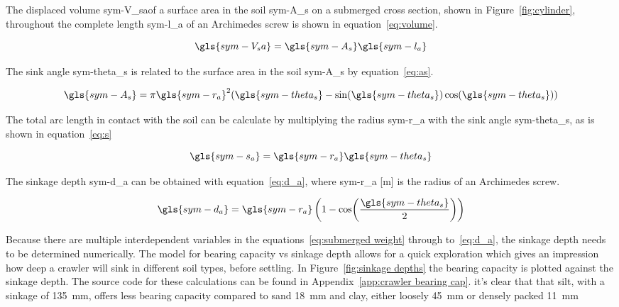 \noindent The displaced volume \gls{sym-V_sa}of a surface area in the soil \gls{sym-A_s} on a submerged cross section,
shown in Figure~\ref{fig:cylinder}, throughout the complete length \gls{sym-l_a} of an Archimedes screw is shown in
equation~\ref{eq:volume}.

\begin{equation}
    \label{eq:volume}
    \gls{sym-V_sa} = \gls{sym-A_s} \gls{sym-l_a}
\end{equation}

\noindent The sink angle \gls{sym-theta_s} is related to the surface area in the soil \gls{sym-A_s} by
equation~\ref{eq:as}.

\begin{equation}
    \label{eq:as}
    \gls{sym-A_s} = \pi \gls{sym-r_a}^2(\gls{sym-theta_s} - \sin(\gls{sym-theta_s})\cos(\gls{sym-theta_s}))
\end{equation}

\noindent The total arc length in contact with the soil can be calculate by multiplying the radius \gls{sym-r_a}
with the sink angle \gls{sym-theta_s}, as is shown in equation~\ref{eq:s}

\begin{equation}
    \label{eq:s}
    \gls{sym-s_a} = \gls{sym-r_a} \gls{sym-theta_s}
\end{equation}

\noindent The sinkage depth \gls{sym-d_a} can be obtained with equation~\ref{eq:d_a}, where \gls{sym-r_a} [m]
is the radius of an Archimedes screw.

\begin{equation}
    \label{eq:d_a}
    \gls{sym-d_a} = \gls{sym-r_a}\left(1-\cos(\frac{\gls{sym-theta_s}}{2})\right)
\end{equation}

Because there are multiple interdependent variables in the equations~\ref{eq:submerged weight} through 
to~\ref{eq:d_a}, the sinkage depth needs to be determined numerically. The model for bearing capacity vs sinkage 
depth allows for a quick exploration which gives an impression how deep a crawler will sink in different soil types, 
before settling. In Figure~\ref{fig:sinkage depths} the bearing capacity is plotted against the sinkage depth. The 
source code for these calculations can be found in Appendix~\ref{app:crawler bearing cap}. it's clear that that silt,
with a sinkage of \SI{135}{\milli\meter}, offers less bearing capacity compared to sand \SI{18}{\milli\meter} and 
clay, either loosely \SI{45}{\milli\meter} or densely packed \SI{11}{\milli\meter}

